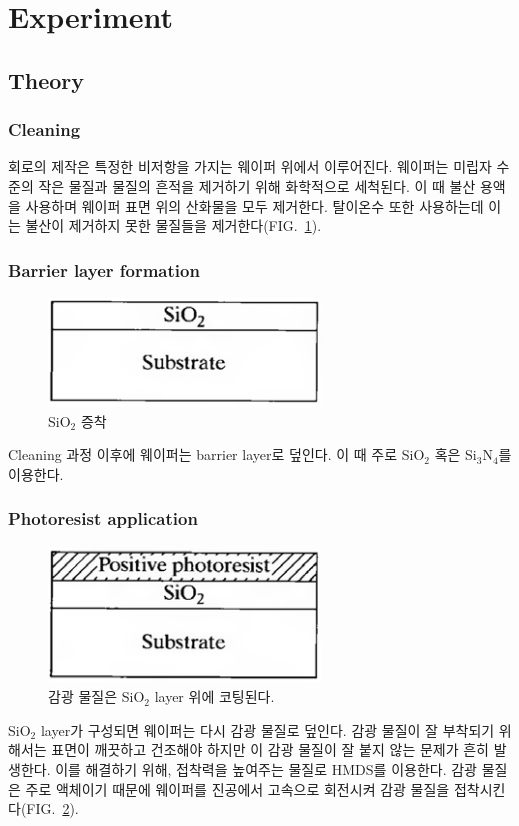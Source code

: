 \documentclass[aps,reprint,superscriptaddress,10pt]{revtex4-2}
\begin{document}
\section{Experiment}

\subsection{Theory}
\subsubsection{Cleaning}
회로의 제작은 특정한 비저항을 가지는 웨이퍼 위에서 이루어진다. 웨이퍼는 미립자 수준의
작은 물질과 물질의 흔적을 제거하기 위해 화학적으로 세척된다. 이 때 불산 용액을 사용하며
웨이퍼 표면 위의 산화물을 모두 제거한다. 탈이온수 또한 사용하는데 이는 불산이 제거하지 못한
물질들을 제거한다(FIG.~\ref{fig:a}).
\subsubsection{Barrier layer formation}
\begin{figure}[htbp]
  \centering
\includegraphics[scale=0.4]{a.png}

  \caption{SiO$_2$ 증착}
  \label{fig:a}
\end{figure}

Cleaning 과정 이후에 웨이퍼는 barrier layer로 덮인다. 이 때 주로 SiO$_2$ 혹은 Si$_3$N$_4$를 이용한다.

\subsubsection{Photoresist application}
\begin{figure}[htbp]
  \centering
\includegraphics[scale=0.4]{b.png}

  \caption{감광 물질은 SiO$_2$ layer 위에 코팅된다.}
  \label{fig:b}
\end{figure}
SiO$_2$ layer가 구성되면 웨이퍼는 다시 감광 물질로 덮인다. 감광 물질이 잘 부착되기 위해서는
표면이 깨끗하고 건조해야 하지만 이 감광 물질이 잘 붙지 않는 문제가 흔히 발생한다. 이를 해결하기
위해, 접착력을 높여주는 물질로 HMDS를 이용한다. 감광 물질은 주로 액체이기 때문에 웨이퍼를 진공에서
고속으로 회전시켜 감광 물질을 접착시킨다(FIG.~\ref{fig:b}). 
\end{document}
